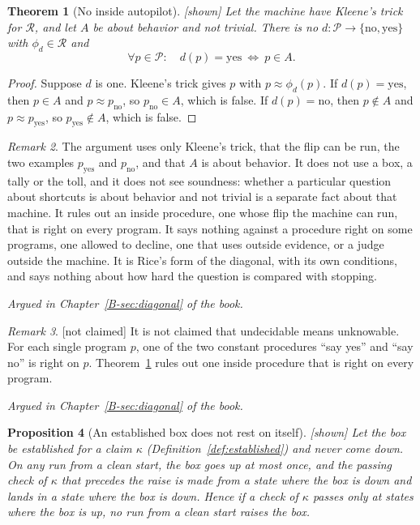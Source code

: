 \documentclass[11pt, a4paper]{article}
\theoremstyle{plain}
\newtheorem{theorem}{Theorem}[section]
\newtheorem{proposition}[theorem]{Proposition}
\theoremstyle{definition}
\theoremstyle{remark}
\newtheorem{remark}[theorem]{Remark}
\newcommand{\Bool}{\{\mathrm{no},\mathrm{yes}\}}
\newcommand{\argued}[1]{\par\noindent\textit{Argued in Chapter~\ref{B-#1} of the book.}\par}
\newcommand{\kind}[1]{\textup{[#1]}}
\begin{document}
\begin{theorem}[No inside autopilot]\label{spec:no-autopilot} \kind{shown}
Let the machine have Kleene's trick for $\mathcal R$, and let $A$ be about behavior and not trivial. There is
no $d:\mathcal P\to\Bool$ with $\phi_d\in\mathcal R$ and
\[
\forall p\in\mathcal P:\quad d(p)=\mathrm{yes}\ \Longleftrightarrow\ p\in A .
\]
\end{theorem}

\begin{proof}
Suppose $d$ is one. Kleene's trick gives $p$ with $p\approx\phi_d(p)$. If $d(p)=\mathrm{yes}$, then $p\in A$
and $p\approx p_{\mathrm{no}}$, so $p_{\mathrm{no}}\in A$, which is false. If $d(p)=\mathrm{no}$, then
$p\notin A$ and $p\approx p_{\mathrm{yes}}$, so $p_{\mathrm{yes}}\notin A$, which is false.
\end{proof}

\begin{remark}
The argument uses only Kleene's trick, that the flip can be run, the two examples $p_{\mathrm{yes}}$ and
$p_{\mathrm{no}}$, and that $A$ is about behavior. It does not use a box, a tally or the toll, and it does
not see soundness: whether a particular question about shortcuts is about behavior and not trivial is a
separate fact about that machine. It rules out an inside procedure, one whose flip the machine can run, that
is right on every program. It says nothing against a procedure right on some programs, one allowed to decline,
one that uses outside evidence, or a judge outside the machine. It is Rice's form of the diagonal, with its
own conditions, and says nothing about how hard the question is compared with stopping.
\end{remark}

\argued{sec:diagonal}

\begin{remark}\label{spec:not-unknowable} \kind{not claimed}
It is not claimed that undecidable means unknowable. For each single program $p$, one of the two constant
procedures ``say yes'' and ``say no'' is right on $p$. Theorem~\ref{spec:no-autopilot} rules out one inside
procedure that is right on every program.
\end{remark}

\argued{sec:diagonal}

\begin{proposition}[An established box does not rest on itself]\label{spec:grounded} \kind{shown}
Let the box be established for a claim $\kappa$ (Definition~\ref{def:established}) and never come down. On any
run from a clean start, the box goes up at most once, and the passing check of $\kappa$ that precedes the raise
is made from a state where the box is down and lands in a state where the box is down. Hence if a check of
$\kappa$ passes only at states where the box is up, no run from a clean start raises the box.
\end{proposition}
\end{document}
